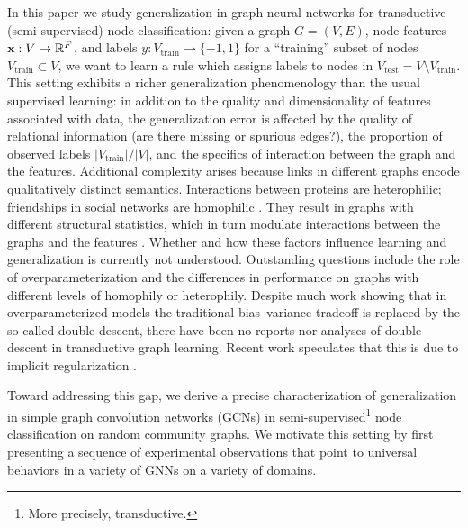 \documentclass[9pt,twocolumn]{pnas-new}
\begin{document}
In this paper we study generalization in graph neural networks for transductive (semi-supervised) node classification: given a graph $G = (V, E)$, node features $\mathbf{x} : V \to \mathbb{R}^F$, and labels $y : V_{\text{train}} \to \{-1, 1\}$ for a ``training'' subset of nodes $V_{\text{train}} \subset V$, we want to learn a rule which assigns labels to nodes in $V_{\text{test}} = V \setminus V_{\text{train}}$. This setting exhibits a richer generalization phenomenology than the usual supervised learning: in addition to the quality and dimensionality of features associated with data, the generalization error is affected by the quality of relational information (are there missing or spurious edges?), the proportion of observed labels $|V_{\text{train}}| / |V|$, and the specifics of interaction between the graph and the features. Additional complexity arises because links in different graphs encode qualitatively distinct semantics. Interactions between proteins are heterophilic; friendships in social networks are homophilic \cite{zhu2020beyond}. They result in graphs with different structural statistics, which in turn modulate interactions between the graphs and the features \cite{pei2020geom,chien2021adaptive}. Whether and how these factors influence learning and generalization is currently not understood. Outstanding questions include the role of overparameterization and the differences in performance on graphs with different levels of homophily or heterophily. Despite much work showing that in overparameterized models the traditional bias--variance tradeoff is replaced by the so-called double descent, there have been no reports nor analyses of double descent in transductive graph learning. Recent work speculates that this is due to implicit regularization \cite{Oono2020Graph}. 

Toward addressing this gap, we derive a precise characterization of  generalization in simple graph convolution networks (GCNs) in semi-supervised\footnote{More precisely, transductive.} node classification on random community graphs. We motivate this setting by first presenting a sequence of experimental observations that point to universal behaviors in a variety of GNNs on a variety of domains.
 
\end{document}
